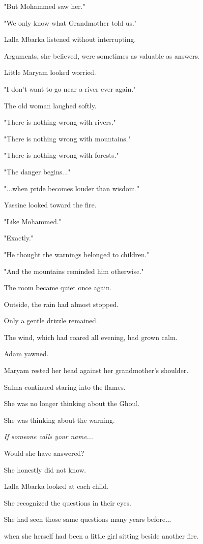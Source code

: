 \documentclass[12pt,openany]{book}
\begin{document}
"But Mohammed saw her."

"We only know what Grandmother told us."

Lalla Mbarka listened without interrupting.

Arguments, she believed, were sometimes as valuable as answers.

Little Maryam looked worried.

"I don't want to go near a river ever again."

The old woman laughed softly.

"There is nothing wrong with rivers."

"There is nothing wrong with mountains."

"There is nothing wrong with forests."

"The danger begins..."

"...when pride becomes louder than wisdom."

Yassine looked toward the fire.

"Like Mohammed."

"Exactly."

"He thought the warnings belonged to children."

"And the mountains reminded him otherwise."

The room became quiet once again.

Outside, the rain had almost stopped.

Only a gentle drizzle remained.

The wind, which had roared all evening, had grown calm.

Adam yawned.

Maryam rested her head against her grandmother's shoulder.

Salma continued staring into the flames.

She was no longer thinking about the Ghoul.

She was thinking about the warning.

\emph{If someone calls your name...}

Would she have answered?

She honestly did not know.

Lalla Mbarka looked at each child.

She recognized the questions in their eyes.

She had seen those same questions many years before...

when she herself had been a little girl sitting beside another fire.
\end{document}

